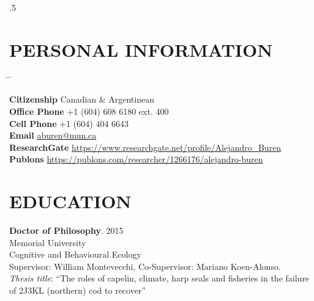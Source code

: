\documentclass{res}
\begin{document}
 
\thispagestyle{empty} %
\address{Senior Fisheries Biologist\\
	Ecofish Research Ltd.\\
	\\	
	Research Scientist\\
Fisheries and Oceans Canada
}


\begin{resume}
\vspace{0.3in}
\moveleft.5\sectionwidth\centerline{ }  

\section{PERSONAL INFORMATION}

\parbox{0.5\textwidth}{ %
	\begin{tabbing} %
		\hspace{3cm} \= \hspace{4cm} \= \kill %
		
		{\bf Citizenship} \> Canadian \& Argentinean \\%
		
	    {\bf Office Phone} \> +1 (604) 608 6180 ext. 400 \\ %
		{\bf Cell Phone} \> +1 (604) 404 6643 \\ %
	
		{\bf Email} \> \href{mailto:aburen@mun.ca}{aburen@mun.ca}\\
		 
		{\bf ResearchGate} \> \url{https://www.researchgate.net/profile/Alejandro_Buren}\\
		
		{\bf Publons} \> \url{https://publons.com/researcher/1266176/alejandro-buren}
    \end{tabbing}
}
\hfill 

\section{EDUCATION}
\vspace{0.1in} 
 
\textbf{Doctor of Philosophy}. 2015 \\
Memorial University \\
Cognitive and Behavioural Ecology \\
Supervisor: William Montevecchi, Co-Supervisor: Mariano Koen-Alonso.\\
\textit{Thesis title}: “The roles of capelin, climate, harp seals and fisheries in the failure of 2J3KL (northern) cod to recover”


\end{resume}
\end{document}
